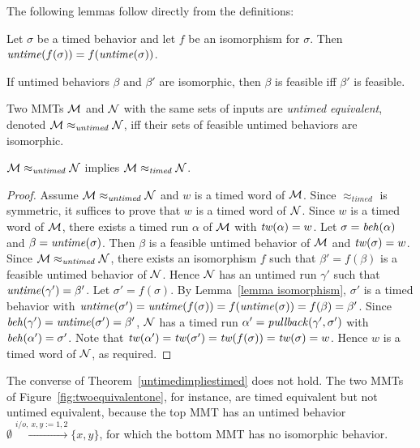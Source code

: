 The following lemmas follow directly from the definitions:
\begin{lemma}
\label{lemma isomorphism}
Let $\sigma$ be a timed behavior and let $f$ be an isomorphism for $\sigma$.
Then $\mathit{untime}(f(\sigma)) = f(\mathit{untime}(\sigma))$.
\end{lemma}
\begin{lemma}
If untimed behaviors $\beta$ and $\beta'$ are isomorphic, then $\beta$ is feasible iff $\beta'$ is feasible.
\end{lemma}

\fi
Two MMTs ${\cal M}$ and ${\cal N}$ with the same sets of inputs are \emph{untimed equivalent}, denoted ${\cal M} \approx_{\mathit{untimed}} {\cal N}$, iff their sets of feasible untimed behaviors are isomorphic.

\begin{theorem}
\label{untimedimpliestimed}
${\cal M} \approx_{\mathit{untimed}} {\cal N}$
implies
${\cal M} \approx_{\mathit{timed}} {\cal N}$.
\end{theorem}
\iflong
\begin{proof}
Assume ${\cal M} \approx_{\mathit{untimed}} {\cal N}$ and $w$ is a timed word of ${\cal M}$.
Since $\approx_{\mathit{timed}}$ is symmetric, it suffices to prove that $w$ is a timed word of ${\cal N}$.
Since $w$ is a timed word of ${\cal M}$,
there exists a timed run $\alpha$ of ${\cal M}$ with $\mathit{tw}(\alpha) = w$. 
Let $\sigma = \mathit{beh}(\alpha)$ and $\beta = \mathit{untime}(\sigma)$. 
Then $\beta$ is a feasible untimed behavior of ${\cal M}$ and $\mathit{tw}(\sigma) = w$.
Since  ${\cal M} \approx_{\mathit{untimed}} {\cal N}$, there exists an isomorphism $f$ such that 
$\beta' = f(\beta)$ is a feasible untimed behavior of ${\cal N}$.
Hence ${\cal N}$ has an untimed run $\gamma'$ such that $\mathit{untime}(\gamma') = \beta'$.
Let $\sigma' = f(\sigma)$.
By Lemma~\ref{lemma isomorphism}, $\sigma'$ is a timed behavior with 
$\mathit{untime}(\sigma') = \mathit{untime}(f(\sigma)) = f(\mathit{untime}(\sigma)) = f(\beta) = \beta'$.
Since $\mathit{beh}(\gamma') = \mathit{untime}(\sigma') = \beta'$, ${\cal N}$ has a timed run $\alpha' = \mathit{pullback}(\gamma',\sigma')$ with
$\mathit{beh}(\alpha') = \sigma'$.
Note that $\mathit{tw}(\alpha') = \mathit{tw}(\sigma') = \mathit{tw}(f(\sigma)) = \mathit{tw}(\sigma) = w$.
Hence $w$ is a timed word of ${\cal N}$, as required.
\end{proof}
\fi
The converse of Theorem~\ref{untimedimpliestimed} does not hold. 
The two MMTs of Figure~\ref{fig:twoequivalentone}, for instance,
are timed equivalent but not untimed equivalent,
because the top MMT has an untimed behavior
$ \emptyset \xrightarrow{i/o,~ x, y:=1,2 } \{ x, y \}$, for which the bottom MMT has no isomorphic behavior.
